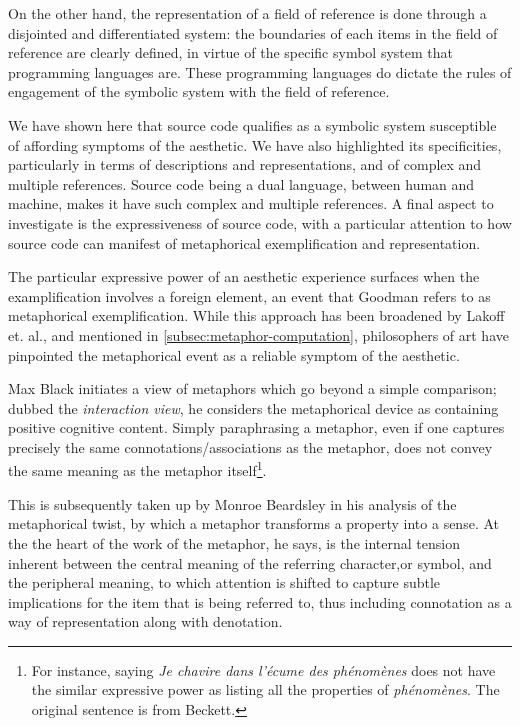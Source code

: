On the other hand, the representation of a field of reference is done through a disjointed and differentiated system: the boundaries of each items in the field of reference are clearly defined, in virtue of the specific symbol system that programming languages are. These programming languages do dictate the rules of engagement of the symbolic system with the field of reference.

We have shown here that source code qualifies as a symbolic system susceptible of affording symptoms of the aesthetic. We have also highlighted its specificities, particularly in terms of descriptions and representations, and of complex and multiple references. Source code being a dual language, between human and machine, makes it have such complex and multiple references. A final aspect to investigate is the expressiveness of source code, with a particular attention to how source code can manifest of metaphorical exemplification and representation.

The particular expressive power of an aesthetic experience surfaces when the examplification involves a foreign element, an event that Goodman refers to as metaphorical exemplification. While this approach has been broadened by Lakoff et. al., and mentioned in \ref{subsec:metaphor-computation}, philosophers of art have pinpointed the metaphorical event as a reliable symptom of the aesthetic.

Max Black initiates a view of metaphors which go beyond a simple comparison; dubbed the \emph{interaction view}, he considers the metaphorical device as containing positive cognitive content. Simply paraphrasing a metaphor, even if one captures precisely the same connotations/associations as the metaphor, does not convey the same meaning as the metaphor itself\footnote{For instance, saying \emph{Je chavire dans l'écume des phénomènes} does not have the similar expressive power as listing all the properties of \emph{phénomènes}. The original sentence is from Beckett.}.

This is subsequently taken up by Monroe Beardsley in his analysis of the metaphorical twist, by which a metaphor transforms a property into a sense. At the the heart of the work of the metaphor, he says, is the internal tension inherent between the central meaning of the referring character,or symbol, and the peripheral meaning, to which attention is shifted to capture subtle implications for the item that is being referred to, thus including connotation as a way of representation along with denotation.

